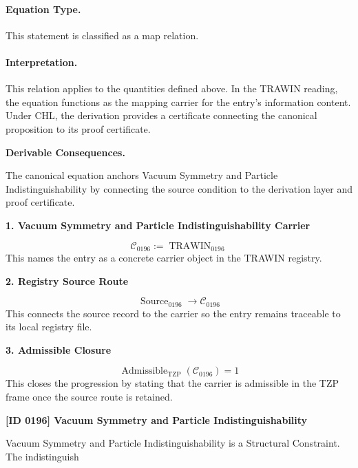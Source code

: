 \paragraph{Equation Type.}
This statement is classified as a map relation.

\paragraph{Interpretation.}
This relation applies to the quantities defined above. In the TRAWIN reading, the equation functions as the mapping carrier for the entry’s information content. Under CHL, the derivation provides a certificate connecting the canonical proposition to its proof certificate.

\par\vspace{0.35em}
\noindent\textbf{Derivable Consequences.}\quad
\begingroup
\footnotesize
\raggedright
The canonical equation anchors Vacuum Symmetry and Particle Indistinguishability by connecting the source condition to the derivation layer and proof certificate.
\par\endgroup

\noindent\textbf{1. Vacuum Symmetry and Particle Indistinguishability Carrier}\par
\[
\mathcal{C}_{0196} := \operatorname{TRAWIN}_{0196}
\]
\noindent This names the entry as a concrete carrier object in the TRAWIN registry.\par
\noindent\textbf{2. Registry Source Route}\par
\[
\operatorname{Source}_{0196}\longrightarrow \mathcal{C}_{0196}
\]
\noindent This connects the source record to the carrier so the entry remains traceable to its local registry file.\par
\noindent\textbf{3. Admissible Closure}\par
\[
\operatorname{Admissible}_{\mathrm{TZP}}\!\left(\mathcal{C}_{0196}\right)=1
\]
\noindent This closes the progression by stating that the carrier is admissible in the TZP frame once the source route is retained.\par

\clearpage
\noindent\textbf{[ID 0196] Vacuum Symmetry and Particle Indistinguishability}\par
\vspace{0.35em}
\begingroup\small
{}
Vacuum Symmetry and Particle Indistinguishability is a Structural Constraint. The indistinguish

